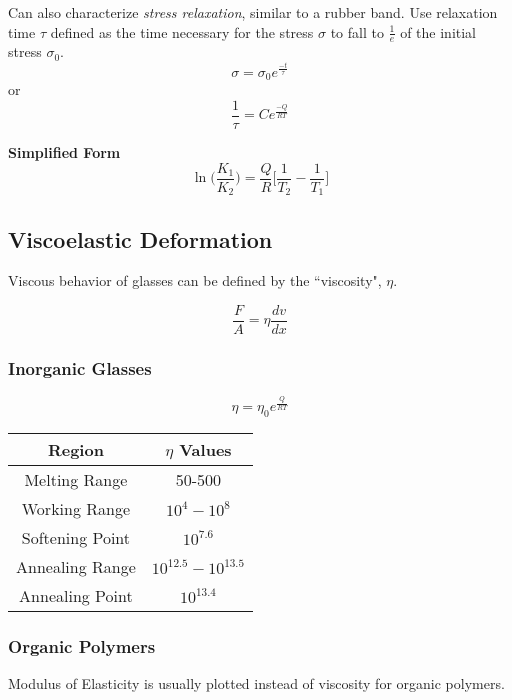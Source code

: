 \documentclass[10pt,letterpaper]{article}
\begin{document}
	Can also characterize \textit{stress relaxation}, similar to a rubber band.  Use relaxation time $\tau$ defined as the time necessary for the stress $\sigma$ to fall to $\frac{1}{e}$ of the initial stress $\sigma_0$. 
	$$
	\sigma = \sigma_0 e^{\frac{-t}{\tau}}
	$$
	or
	$$
	\frac{1}{\tau} = Ce^{\frac{-Q}{RT}}
	$$
	
	\textbf{Simplified Form}
	$$
	\ln \bigg( \frac{K_1}{K_2} \bigg) = \frac{Q}{R} \bigg[ \frac{1}{T_2} - \frac{1}{T_1} \bigg]
	$$
	
	\subsection{Viscoelastic Deformation}
	Viscous behavior of glasses can be defined by the ``viscosity", $\eta$. 
	
	$$
	\frac{F}{A} = \eta \frac{dv}{dx}
	$$
	
	\subsubsection*{Inorganic Glasses}
	$$
	\eta = \eta_0 e^\frac{Q}{RT}
	$$
	
	\begin{tabular}{|c|c|}
		\hline Region & $\eta$ Values \\ 
		\hline Melting Range & 50-500 \\ 
		\hline Working Range & $10^4 - 10^8$ \\ 
		\hline Softening Point & $10^{7.6}$ \\ 
		\hline Annealing Range & $10^{12.5}-10^{13.5}$ \\ 
		\hline Annealing Point & $10^{13.4}$ \\ 
		\hline 
	\end{tabular} 
	
	\subsubsection*{Organic Polymers}
	Modulus of Elasticity is usually plotted instead of viscosity for organic polymers. 
	
\end{document}
